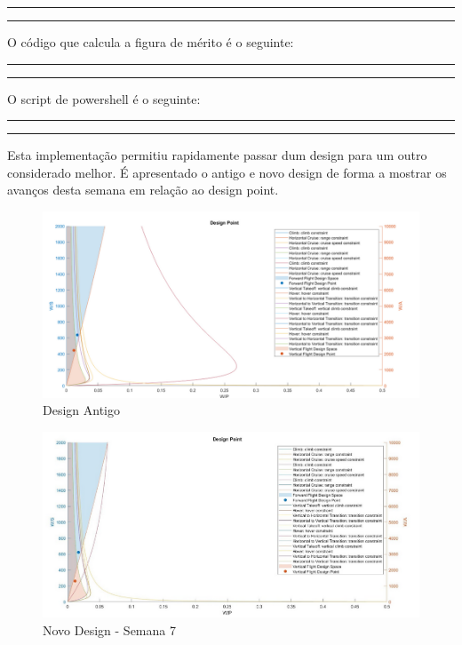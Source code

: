 \vspace{5pt}
\hrule

\hrule
\vspace{20pt}
O código que calcula a figura de mérito é o seguinte:\par
\vspace{2pt}
\hrule

\hrule
\vspace{20pt}
O script de powershell é o seguinte:
\vspace{2pt}
\hrule

\hrule
\vspace{20pt}
Esta implementação permitiu rapidamente passar dum design para um outro considerado melhor. É apresentado o antigo e novo design de forma a mostrar os avanços desta semana em relação ao design point.\par
\FloatBarrier
\begin{figure}[h]
        \centering
    \includegraphics[width=\textwidth]{Imagens/json_1_semana7.PNG}
    \caption{Design Antigo}
    \label{json_1_semana7}
\end{figure}
\FloatBarrier
\begin{figure}[h]
     \centering
    \includegraphics[width=\textwidth]{Imagens/json_2_semana7.PNG}
    \caption{Novo Design - Semana 7}
    \label{json_1_semana7}
\end{figure}
\FloatBarrier